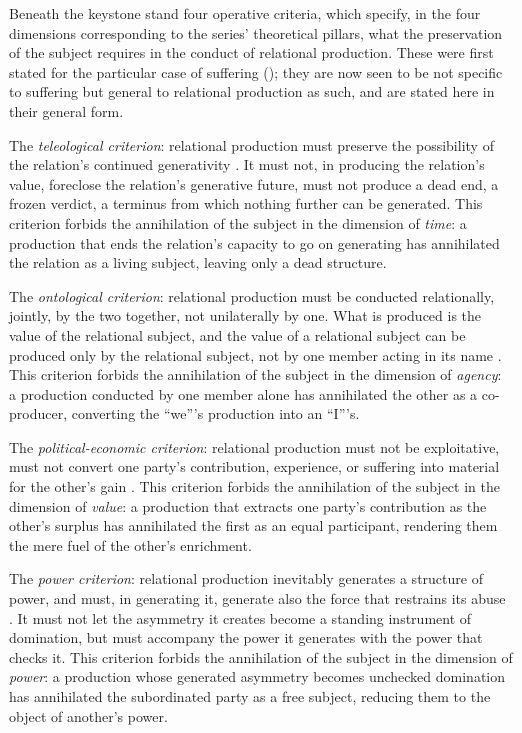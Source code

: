 Beneath the keystone stand four operative criteria, which specify, in the four dimensions corresponding to the series' theoretical pillars, what the preservation of the subject requires in the conduct of relational production. These were first stated for the particular case of suffering (); they are now seen to be not specific to suffering but general to relational production as such, and are stated here in their general form.

The \emph{teleological criterion}: relational production must preserve the possibility of the relation's continued generativity \parencite{paperix}. It must not, in producing the relation's value, foreclose the relation's generative future, must not produce a dead end, a frozen verdict, a terminus from which nothing further can be generated. This criterion forbids the annihilation of the subject in the dimension of \emph{time}: a production that ends the relation's capacity to go on generating has annihilated the relation as a living subject, leaving only a dead structure.

The \emph{ontological criterion}: relational production must be conducted relationally, jointly, by the two together, not unilaterally by one. What is produced is the value of the relational subject, and the value of a relational subject can be produced only by the relational subject, not by one member acting in its name \parencite{wan2024grb}. This criterion forbids the annihilation of the subject in the dimension of \emph{agency}: a production conducted by one member alone has annihilated the other as a co-producer, converting the ``we'''s production into an ``I'''s.

The \emph{political-economic criterion}: relational production must not be exploitative, must not convert one party's contribution, experience, or suffering into material for the other's gain \parencite{paperxv,paperxvii}. This criterion forbids the annihilation of the subject in the dimension of \emph{value}: a production that extracts one party's contribution as the other's surplus has annihilated the first as an equal participant, rendering them the mere fuel of the other's enrichment.

The \emph{power criterion}: relational production inevitably generates a structure of power, and must, in generating it, generate also the force that restrains its abuse \parencite{paperxvii}. It must not let the asymmetry it creates become a standing instrument of domination, but must accompany the power it generates with the power that checks it. This criterion forbids the annihilation of the subject in the dimension of \emph{power}: a production whose generated asymmetry becomes unchecked domination has annihilated the subordinated party as a free subject, reducing them to the object of another's power.

